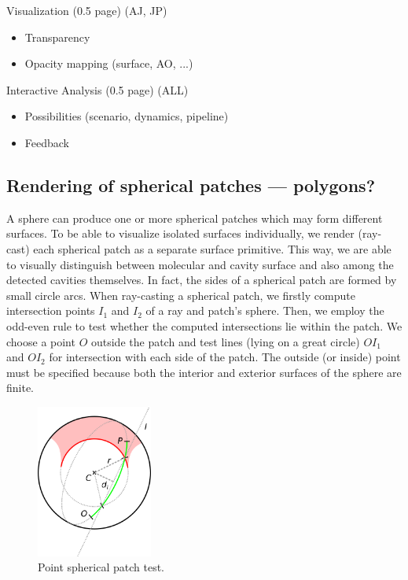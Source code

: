 Visualization (0.5 page) (AJ, JP)
\begin{itemize}
  \item Transparency
	\item Opacity mapping (surface, AO, ...)
\end{itemize}

Interactive Analysis (0.5 page) (ALL)
\begin{itemize}
  \item Possibilities (scenario, dynamics, pipeline)
  \item Feedback
\end{itemize}

\subsection{Rendering of spherical patches --- polygons?}
\label{sec:spherical-patches}
A sphere can produce one or more spherical patches which may form different surfaces.
To be able to visualize isolated surfaces individually, we render (ray-cast) each spherical patch as a separate surface primitive.
This way, we are able to visually distinguish between molecular and cavity surface and also among the detected cavities themselves.
In fact, the sides of a spherical patch are formed by small circle arcs.
When ray-casting a spherical patch, we firstly compute intersection points $I_1$ and $I_2$ of a ray and patch's sphere.
Then, we employ the odd-even rule to test whether the computed intersections lie within the patch.
We choose a point $O$ outside the patch and test lines (lying on a great circle) $OI_1$ and $OI_2$ for intersection with each side of the patch.
The outside (or inside) point must be specified because both the interior and exterior surfaces of the sphere are finite.

\begin{figure}[htb]
  \centering
  \includegraphics[width=1.5in]{image/patch.png}
  \caption{Point spherical patch test.}
\end{figure}

